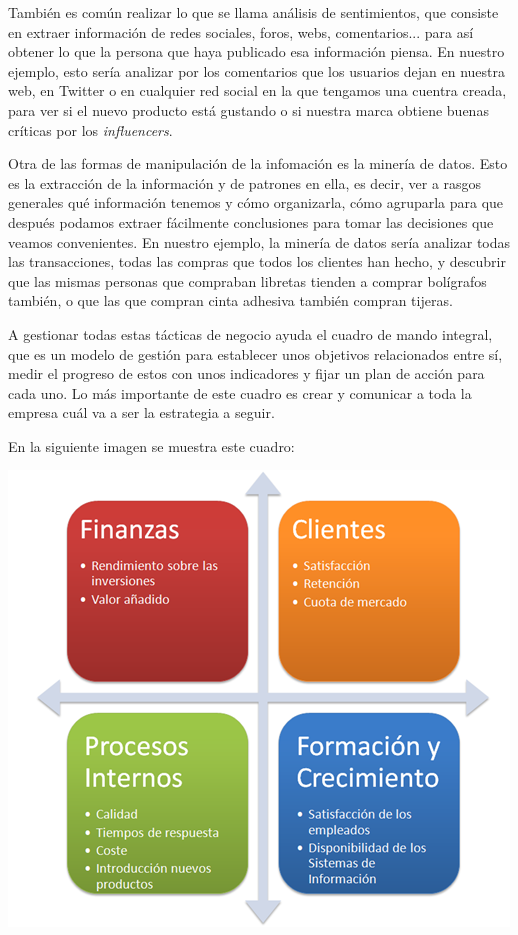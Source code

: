 \documentclass{article}
\begin{document}
También es común realizar lo que se llama análisis de sentimientos, que consiste en extraer información de redes sociales, foros, webs, comentarios... para así obtener lo que la persona que haya publicado esa información piensa. En nuestro ejemplo, esto sería analizar por los comentarios que los usuarios dejan en nuestra web, en Twitter o en cualquier red social en la que tengamos una cuentra creada, para ver si el nuevo producto está gustando o si nuestra marca obtiene buenas críticas por los \textit{influencers}. 

Otra de las formas de manipulación de la infomación es la minería de datos. Esto es la extracción de la información y de patrones en ella, es decir, ver a rasgos generales qué información tenemos y cómo organizarla, cómo agruparla para que después podamos extraer fácilmente conclusiones para tomar las decisiones que veamos convenientes.  En nuestro ejemplo, la minería de datos sería analizar todas las transacciones, todas las compras que todos los clientes han hecho, y descubrir que las mismas personas que compraban libretas tienden a comprar bolígrafos también, o que las que compran cinta adhesiva también compran tijeras.

A gestionar todas estas tácticas de negocio ayuda el cuadro de mando integral, que es un modelo de gestión para establecer unos objetivos relacionados entre sí, medir el progreso de estos con unos indicadores y fijar un plan de acción para cada uno. Lo más importante de este cuadro es crear y comunicar a toda la empresa cuál va a ser la estrategia a seguir.

En la siguiente imagen se muestra este cuadro:

\begin{flushleft}
\includegraphics[scale=0.7]{Cuadro-de-Mando-Integral1.png}
\end{flushleft}
\end{document}
